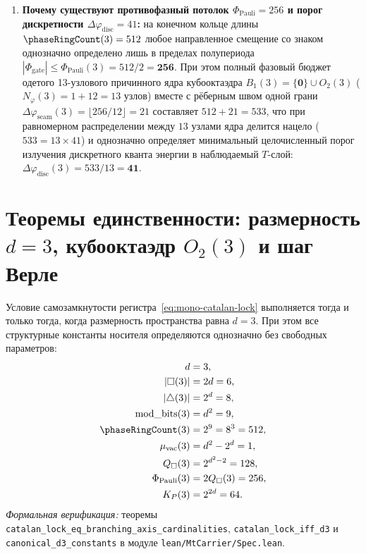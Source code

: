 \begin{enumerate}[label=\textbf{Шаг \arabic*.},leftmargin=*]
\item \textbf{Почему существуют противофазный потолок $\Phi_{\mathrm{Pauli}} = 256$ и порог дискретности $\Delta\varphi_{\mathrm{disc}} = 41$:}
  на конечном кольце длины $\phaseRingCount(3) = 512$ любое направленное смещение со знаком однозначно определено лишь в пределах полупериода $|\Phi_{\mathrm{gate}}| \le \Phi_{\mathrm{Pauli}}(3) = 512 / 2 = \mathbf{256}$. При этом полный фазовый бюджет одетого 13-узлового причинного ядра кубооктаэдра $B_1(3) = \{\mathbf{0}\} \cup O_2(3)$ ($N_\varphi(3) = 1 + 12 = 13$ узлов) вместе с рёберным швом одной грани $\Delta\varphi_{\mathrm{seam}}(3) = \lfloor 256 / 12 \rfloor = 21$ составляет $512 + 21 = 533$, что при равномерном распределении между $13$ узлами ядра делится нацело ($533 = 13 \times 41$) и однозначно определяет минимальный целочисленный порог излучения дискретного кванта энергии в наблюдаемый $T$-слой: $\Delta\varphi_{\mathrm{disc}}(3) = 533 / 13 = \mathbf{41}$.
\end{enumerate}

\section{Теоремы единственности: размерность \texorpdfstring{$d=3$}{d=3}, кубооктаэдр \texorpdfstring{$O_2(3)$}{O2(3)} и шаг Верле}

\begin{theorem}[Единственность размерности $d=3$ и параметров кольца $\mathbb{Z}_{512}$]
\label{thm:mono-d3-uniqueness}
Условие самозамкнутости регистра~\eqref{eq:mono-catalan-lock} выполняется тогда и только тогда, когда размерность пространства равна $d = 3$. При этом все структурные константы носителя определяются однозначно без свободных параметров:
\begin{align}
  d &= 3, \label{eq:mono-d3-constants} \\
  |\square(3)| &= 2d = 6, \label{eq:mono-d3-squares} \\
  |{\triangle}(3)| &= 2^d = 8, \label{eq:mono-d3-triangles} \\
  \mathrm{mod\_bits}(3) &= d^2 = 9, \label{eq:mono-d3-modbits} \\
  \phaseRingCount(3) &= 2^9 = 8^3 = 512, \label{eq:mono-d3-nring} \\
  \mu_{\mathrm{vac}}(3) &= d^2 - 2^d = 1, \label{eq:mono-d3-muvac} \\
  Q_\square(3) &= 2^{d^2-2} = 128, \label{eq:mono-d3-qsquare} \\
  \Phi_{\mathrm{Pauli}}(3) &= 2 Q_\square(3) = 256, \label{eq:mono-d3-pauli} \\
  K_P(3) &= 2^{2d} = 64. \label{eq:mono-d3-kp}
\end{align}
\emph{Формальная верификация:} теоремы \texttt{catalan\_\allowbreak lock\_\allowbreak eq\_\allowbreak branch\allowbreak ing\_\allowbreak axis\_\allowbreak cardi\allowbreak nalities}, \texttt{catalan\_\allowbreak lock\_\allowbreak iff\_\allowbreak d3} и \texttt{canonical\_\allowbreak d3\_\allowbreak constants} в модуле \texttt{lean/\allowbreak MtCarrier/\allowbreak Spec.lean}.
\end{theorem}

